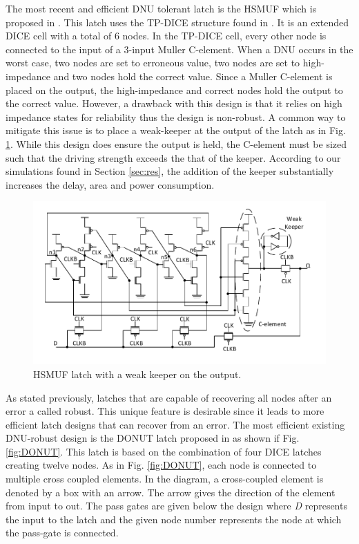 The most recent and efficient DNU tolerant latch is the HSMUF which is proposed in \cite{HSMUF}. This latch uses the TP-DICE structure found in \cite{TPDICE}. It is an extended DICE cell with a total of 6 nodes. In the TP-DICE cell, every other node is connected to the input of a 3-input Muller C-element. When a DNU occurs in the worst case, two nodes are set to erroneous value, two nodes are set to high-impedance and two nodes hold the correct value. Since a Muller C-element is placed on the output, the high-impedance and correct nodes hold the output to the correct value. However, a drawback with this design is that it relies on high impedance states for reliability thus the design is non-robust. A common way to mitigate this issue is to place a weak-keeper at the output of the latch as in Fig. \ref{HSMUF_fig}. While this design does ensure the output is held, the C-element must be sized such that the driving strength exceeds the that of the keeper. According to our simulations found in Section \ref{sec:res}, the addition of the keeper substantially increases the delay, area and power consumption. 

\begin{figure}[!htbp]
\centering
\includegraphics[width=\linewidth]{Figures/HSMUF}
\caption{HSMUF latch \cite{HSMUF} with a weak keeper on the output.}
\label{HSMUF_fig}
\end{figure}
 
As stated previously, latches that are capable of recovering all nodes after an error a called robust. This unique feature is desirable since it leads to more efficient latch designs that can recover from an error. The most efficient existing DNU-robust design is the DONUT latch proposed in \cite{DONUT} as shown if Fig. \ref{fig:DONUT}. This latch is based on the combination of four DICE latches creating twelve nodes. As in Fig. \ref{fig:DONUT}, each node is connected to multiple cross coupled elements. In the diagram, a cross-coupled element is denoted by a box with an arrow. The arrow gives the direction of the element from input to out. The pass gates are given below the design where \textit{D} represents the input to the latch and the given node number represents the node at which the pass-gate is connected.

